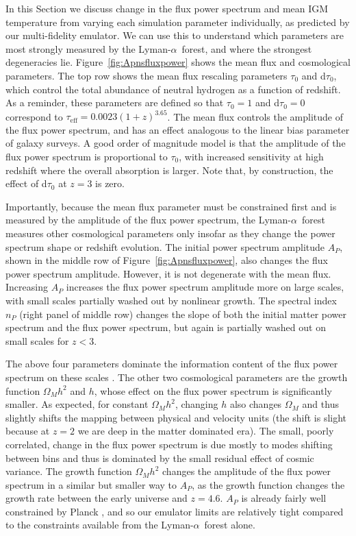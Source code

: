 \documentclass[a4paper,11pt]{article}
\newcommand{\Lya}{Lyman-$\alpha$}
\begin{document}
In this Section we discuss change in the flux power spectrum and mean IGM temperature from varying each simulation parameter individually, as predicted by our multi-fidelity emulator. We can use this to understand which parameters are most strongly measured by the \Lya~forest, and where the strongest degeneracies lie. Figure~\ref{fig:Apnsfluxpower} shows the mean flux and cosmological parameters. The top row shows the mean flux rescaling parameters $\tau_0$ and d$\tau_0$, which control the total abundance of neutral hydrogen as a function of redshift. As a reminder, these parameters are defined so that  $\tau_0 = 1$ and d$\tau_0 = 0$ correspond to $\tau_\mathrm{eff} = 0.0023 (1+z)^{3.65}$. The mean flux controls the amplitude of the flux power spectrum, and has an effect analogous to the linear bias parameter of galaxy surveys. A good order of magnitude model is that the amplitude of the flux power spectrum is proportional to $\tau_0$, with increased sensitivity at high redshift where the overall absorption is larger. Note that, by construction, the effect of d$\tau_0$ at $z=3$ is zero.

Importantly, because the mean flux parameter must be constrained first and is measured by the amplitude of the flux power spectrum, the \Lya~forest measures other cosmological parameters only insofar as they change the power spectrum shape or redshift evolution. The initial power spectrum  amplitude $A_P$, shown in the middle row of Figure~\ref{fig:Apnsfluxpower}, also changes the flux power spectrum amplitude. However, it is not degenerate with the mean flux. Increasing $A_P$ increases the flux power spectrum amplitude more on large scales, with small scales partially washed out by nonlinear growth. The spectral index $n_P$ (right panel of middle row) changes the slope of both the initial matter power spectrum and the flux power spectrum, but again is partially washed out on small scales for $z < 3$.

The above four parameters dominate the information content of the flux power spectrum on these scales \cite{Pedersen:2022}. The other two cosmological parameters are the growth function $\Omega_M h^2$ and $h$, whose effect on the flux power spectrum is significantly smaller. As expected, for constant $\Omega_M h^2$, changing $h$ also changes $\Omega_M$ and thus slightly shifts the mapping between physical and velocity units (the shift is slight because at $z=2$ we are deep in the matter dominated era). The small, poorly correlated, change in the flux power spectrum is due mostly to modes shifting between bins and thus is dominated by the small residual effect of cosmic variance. The growth function $\Omega_M h^2$ changes the amplitude of the flux power spectrum in a similar but smaller way to $A_P$, as the growth function changes the growth rate between the early universe and $z = 4.6$. $A_P$ is already fairly well constrained by Planck \cite{Planck:2018}, and so our emulator limits are relatively tight compared to the constraints available from the \Lya~forest alone.
\end{document}
